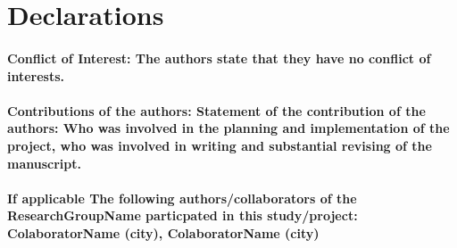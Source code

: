 \documentclass[aac,crcready]{iosart2x}
\begin{document}
\nocite{*} 

\section*{Declarations}
\paragraph{\noindent Conflict of Interest: The authors state that they have no conflict of interests.}


\paragraph{\noindent Contributions of the authors: Statement of the contribution of the authors: Who was involved in the planning and implementation of the project, who was involved in writing and substantial revising of the manuscript.}

\paragraph{\noindent If applicable The following {authors/collaborators} of the ResearchGroupName particpated in this {study/project}: ColaboratorName (city), ColaboratorName (city) }



%
\end{document}
